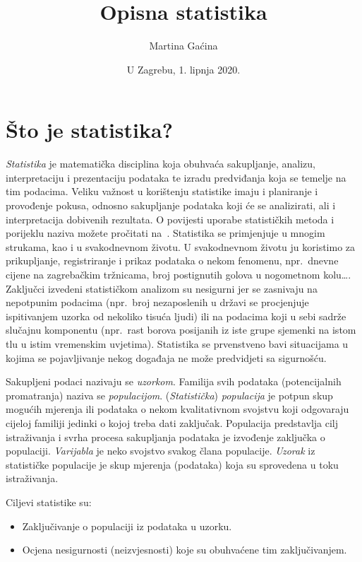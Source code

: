 \documentclass[12pt]{scrartcl}
\title{Opisna statistika}
\author{Martina Gaćina}
\affil{Prirodoslovno--matematički fakultet --- Matematički odsjek}
\date{U Zagrebu, 1. lipnja 2020.}
\begin{document}
\maketitle

\tableofcontents

\section{Što je statistika?}
\emph{Statistika} je matematička disciplina koja obuhvaća sakupljanje, analizu, interpretaciju i prezentaciju podataka te izradu predviđanja koja se temelje na tim podacima. Veliku važnost u korištenju statistike imaju i planiranje i provođenje pokusa, odnosno sakupljanje podataka koji će se analizirati, ali i interpretacija dobivenih rezultata. O povijesti uporabe statističkih metoda i porijeklu naziva možete pročitati na~\cite{uvodustat}. Statistika se primjenjuje u mnogim strukama, kao i u svakodnevnom životu. U svakodnevnom životu ju koristimo za prikupljanje, registriranje i prikaz podataka o nekom fenomenu, npr.\ dnevne cijene na zagrebačkim tržnicama, broj postignutih golova u nogometnom kolu\ldots.  Zaključci izvedeni statističkom analizom su nesigurni jer se zasnivaju na nepotpunim podacima (npr.\ broj nezaposlenih u državi se procjenjuje ispitivanjem uzorka od nekoliko tisuća ljudi) ili na podacima koji u sebi sadrže slučajnu komponentu (npr.\ rast borova posijanih iz iste grupe sjemenki na istom tlu u istim vremenskim uvjetima). Statistika se prvenstveno bavi situacijama u kojima se pojavljivanje nekog događaja ne može predvidjeti sa sigurnošću.
\begin{definicija}
Sakupljeni podaci nazivaju se \emph{uzorkom}. Familija svih podataka (potencijalnih promatranja) naziva se \emph{populacijom}. (\emph{Statistička}) \emph{populacija} je potpun skup mogućih mjerenja ili podataka o nekom kvalitativnom svojstvu koji odgovaraju cijeloj familiji jedinki o kojoj treba dati zaključak. Populacija predstavlja cilj istraživanja i svrha procesa sakupljanja podataka je izvođenje zaključka o populaciji. \emph{Varijabla} je neko svojstvo svakog člana populacije. \emph{Uzorak} iz statističke populacije je skup mjerenja (podataka) koja su sprovedena u toku istraživanja. 
\end{definicija}
Ciljevi statistike su:
\begin{itemize}
    \item Zaključivanje o populaciji iz podataka u uzorku.
    \item Ocjena nesigurnosti (neizvjesnosti) koje su obuhvaćene tim zaključivanjem.
\end{itemize}
\end{document}
